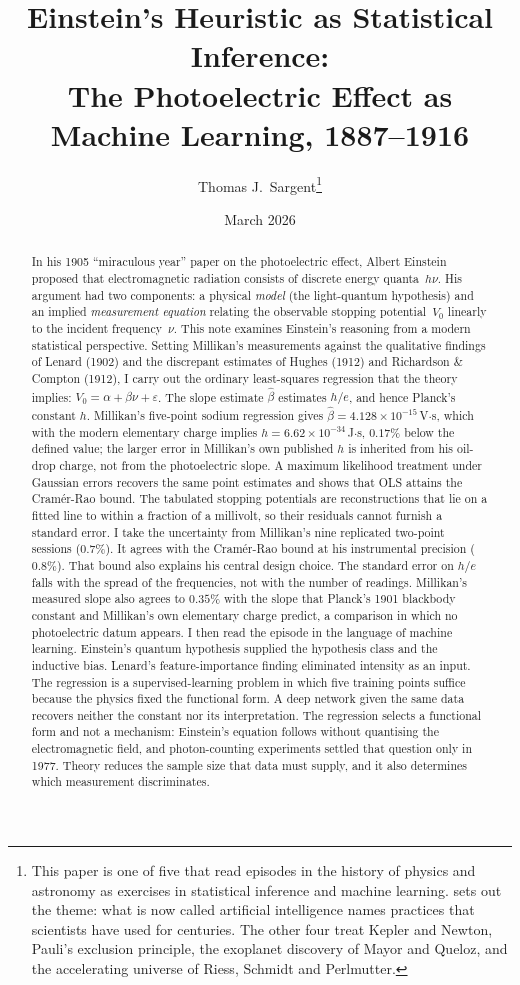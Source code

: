 \documentclass[12pt]{article}
\title{Einstein's Heuristic as Statistical Inference:\\
       The Photoelectric Effect as Machine Learning,
       1887--1916}
\author{Thomas J.\ Sargent\thanks{%
  This paper is one of five that read episodes in the
  history of physics and astronomy as exercises in statistical inference and
  machine learning.  \citet{sargent2025sources} sets out the theme: what is
  now called artificial intelligence names practices that scientists have used
  for centuries.  The other four treat Kepler and Newton, Pauli's exclusion principle, the
  exoplanet discovery of Mayor and Queloz, and the accelerating universe of
  Riess, Schmidt and Perlmutter.}}
\date{March 2026}
\begin{document}
\maketitle

\begin{abstract}
In his 1905 ``miraculous year'' paper on the photoelectric effect, Albert
Einstein proposed that electromagnetic radiation consists of discrete energy
quanta~$h\nu$.  His argument had two components: a physical \emph{model}
(the light-quantum hypothesis) and an implied \emph{measurement equation}
relating the observable stopping potential~$V_0$ linearly to the incident
frequency~$\nu$.  This note examines Einstein's reasoning from a modern
statistical perspective.  Setting Millikan's measurements against the
qualitative findings of Lenard (1902) and the discrepant estimates of Hughes
(1912) and Richardson \& Compton (1912), I carry out the ordinary
least-squares regression that the theory implies:
$V_0 = \alpha + \beta\nu + \varepsilon$.  The slope estimate $\hat\beta$
estimates $h/e$, and hence Planck's constant $h$.  Millikan's five-point
sodium regression gives $\hat\beta = 4.128\times10^{-15}$\,V$\cdot$s, which
with the modern elementary charge implies $h = 6.62\times10^{-34}$\,J$\cdot$s,
$0.17\%$ below the defined value; the larger error in Millikan's own published
$h$ is inherited from his oil-drop charge, not from the photoelectric slope.
A maximum likelihood treatment under Gaussian errors recovers the same point
estimates and shows that OLS attains the Cram\'er-Rao bound.  The tabulated
stopping potentials are reconstructions that lie on a fitted line to within a
fraction of a millivolt, so their residuals cannot furnish a standard error.
I take the uncertainty from Millikan's nine replicated two-point sessions
($0.7\%$).  It agrees with the Cram\'er-Rao bound at his instrumental
precision ($0.8\%$).  That bound also explains his central design choice.  The
standard error on $h/e$ falls with the spread of the frequencies, not with the
number of readings.
Millikan's measured slope also agrees to $0.35\%$ with the slope that
Planck's 1901 blackbody constant and Millikan's own elementary charge
predict, a comparison in which no photoelectric datum appears.
I then read the episode in the language of machine learning.  Einstein's
quantum hypothesis supplied the hypothesis class and the inductive bias.
Lenard's feature-importance finding eliminated intensity as an input.  The
regression is a supervised-learning problem in which five training points
suffice because the physics fixed the functional form.  A deep network given
the same data recovers neither the constant nor its interpretation.  The
regression selects a functional form and not a mechanism: Einstein's equation
follows without quantising the electromagnetic field, and photon-counting
experiments settled that question only in 1977.  Theory reduces the sample
size that data must supply, and it also determines which measurement
discriminates.
\end{abstract}
%
\end{document}
